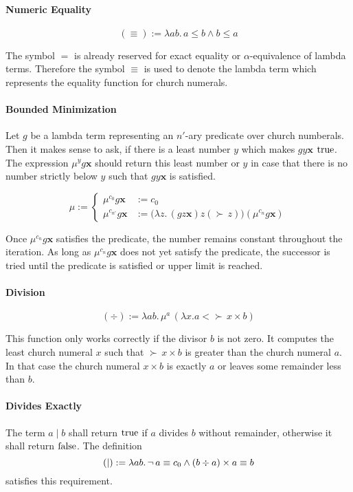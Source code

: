 \paragraph{Numeric Equality}
$$ (\equiv) := \lambda a b.\, a \le b \land b \le a$$

The symbol $=$ is already reserved for exact equality or $\alpha$-equivalence
of lambda terms. Therefore the symbol $\equiv$ is used to denote the lambda
term which represents the equality function for church numerals.


\paragraph{Bounded Minimization} Let $g$ be a lambda term representing an
$n'$-ary predicate over church numberals. Then it makes sense to ask, if there
is a least number $y$ which makes $g y \mathbf{x}$ $\text{true}$. The expression
$\mu^y g \mathbf{x}$ should return this least number or $y$ in case that there
is no number strictly below $y$ such that $g y \mathbf{x}$ is satisfied.

$$\mu :=
\begin{cases}
  \mu^{c_0} g \mathbf{x}    & :=  c_0 \\
  \mu^{c_{n'}} g \mathbf{x} & :=
  \big(\lambda z.\, (g z \mathbf{x}) z (\succ\, z)\big) (\mu^{c_n} g \mathbf{x})
\end{cases}
$$

Once $\mu^{c_n} g \mathbf{x}$ satisfies the predicate, the number remains
constant throughout the iteration. As long as $\mu^{c_n} g \mathbf{x}$ does
not yet satisfy the predicate, the successor is tried until the predicate is
satisfied or upper limit is reached.



\paragraph{Division}
$$ (\div) := \lambda a b.\, \mu^a\, (\lambda x. a < \succ\, x \times b)$$

This function only works correctly if the divisor $b$ is not zero. It computes
the least church numeral $x$ such that $\succ\,x \times b$ is greater than the
church numeral $a$. In that case the church numeral $x \times b$ is exactly
$a$ or leaves some remainder less than $b$.




\paragraph{Divides Exactly} The term $a\mid b$ shall return $\text{true}$ if $a$
divides $b$ without remainder, otherwise it shall return $\text{false}$. The
definition
$$ (\mid) :=
\lambda a b.\,
\neg\, a\equiv c_0 \land
(b \div a)\times a \equiv b
$$
satisfies this requirement.




